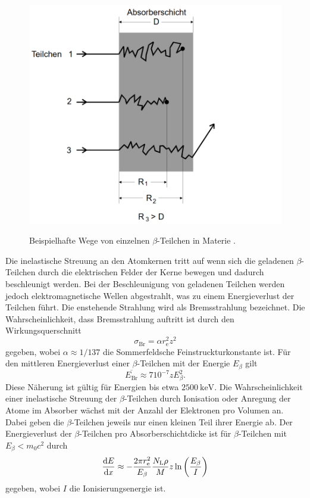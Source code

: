\begin{figure}
	\centering
	\caption{Beispielhafte Wege von einzelnen $\beta$-Teilchen in Materie \cite{V704}.}
	\includegraphics[width=\linewidth-170pt,height=\textheight-170pt,keepaspectratio]{content/images/verlaufTeilchen.png}
	\label{fig:verlaufTeilchen}
\end{figure}
Die inelastische Streuung an den Atomkernen tritt auf wenn sich die geladenen $\beta$-Teilchen durch die elektrischen Felder der Kerne bewegen und dadurch beschleunigt werden. Bei der Beschleunigung von geladenen Teilchen werden jedoch elektromagnetische Wellen abgestrahlt, was zu einem Energieverlust der Teilchen führt. Die enstehende Strahlung wird als Bremsstrahlung bezeichnet. Die Wahrscheinlichkeit, dass Bremsstrahlung auftritt ist durch den Wirkungsquerschnitt
\begin{equation}
\sigma_\text{Br}=\alpha r_\text{e}^2 z^2
\end{equation}
gegeben, wobei $\alpha\approx 1/137$ die Sommerfeldsche Feinstruckturkonstante ist. Für den mittleren Energieverlust einer $\beta$-Teilchen mit der Energie $E_\beta$ gilt
\begin{equation}
\overline{E_\text{Br}} \approx 7 10^{-7} z E_\beta^2 \text{.}
\end{equation}
Diese Näherung ist gültig für Energien bis etwa $\SI{2500}{\kilo\electronvolt}$.
Die Wahrscheinlichkeit einer inelastische Streuung der $\beta$-Teilchen durch Ionisation oder Anregung der Atome im Absorber wächst mit der Anzahl der Elektronen pro Volumen an. Dabei geben die $\beta$-Teilchen jeweils nur einen kleinen Teil ihrer Energie ab. Der Energieverlust der $\beta$-Teilchen pro Absorberschichtdicke ist für $\beta$-Teilchen mit $E_\beta < m_0 c^2$ durch
\begin{equation}
\frac{\mathop{}\!\mathrm{d} E}{\mathop{}\!\mathrm{d} x} \approx - \frac{2 \pi r_\text{e}^2}{E_\beta} \frac{N_\text{L} \rho}{M} z \ln\left(\frac{E_\beta}{I}\right)
\end{equation}
gegeben, wobei $I$ die Ionisierungsenergie ist.

